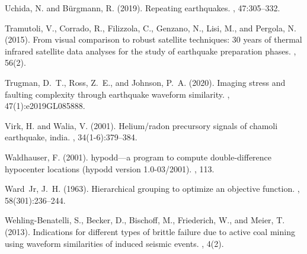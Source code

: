 \documentclass[a4paper,12pt,twoside]{article}
\begin{document}
\begin{thebibliography}{}
{
Uchida, N. and B{\"u}rgmann, R. (2019).
\newblock Repeating earthquakes.
, 47:305--332.}

Tramutoli, V., Corrado, R., Filizzola, C., Genzano, N., Lisi, M., and Pergola,
  N. (2015).
\newblock From visual comparison to robust satellite techniques: 30 years of
  thermal infrared satellite data analyses for the study of earthquake
  preparation phases.
, 56(2).

Trugman, D.~T., Ross, Z.~E., and Johnson, P.~A. (2020).
\newblock Imaging stress and faulting complexity through earthquake waveform
  similarity.
, 47(1):e2019GL085888.

Virk, H. and Walia, V. (2001).
\newblock Helium/radon precursory signals of chamoli earthquake, india.
, 34(1-6):379--384.

Waldhauser, F. (2001).
\newblock hypodd—a program to compute double-difference hypocenter locations
  (hypodd version 1.0-03/2001).
, 113.

Ward~Jr, J.~H. (1963).
\newblock Hierarchical grouping to optimize an objective function.
,
  58(301):236--244.

\protect{}  
  
Wehling-Benatelli, S., Becker, D., Bischoff, M., Friederich, W., and Meier, T.
  (2013).
\newblock Indications for different types of brittle failure due to active coal
  mining using waveform similarities of induced seismic events.
, 4(2).


\end{thebibliography}
\end{document}

